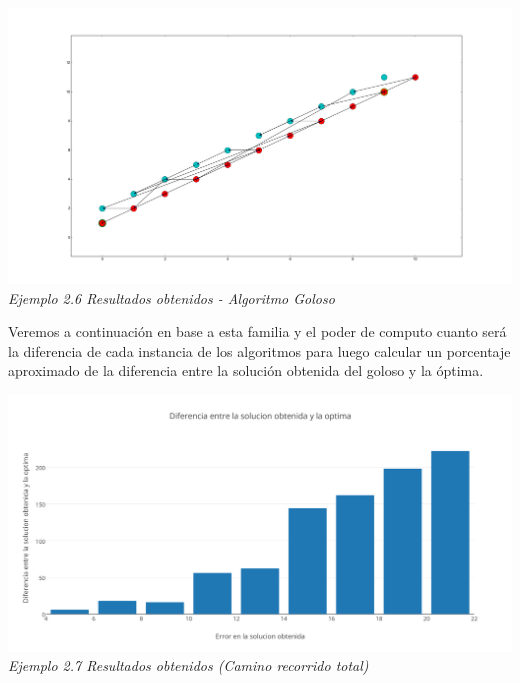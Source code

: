 \vspace*{0.3cm} \vspace*{0.3cm}
  \begin{center}
\includegraphics[scale=0.40]{./EJ2/algunGym0Goloso.png}
\\{\textit{Ejemplo 2.6 Resultados obtenidos - Algoritmo Goloso }}
  \end{center}
  \vspace*{0.3cm}

Veremos a continuaci\'on en base a esta familia y el poder de computo cuanto ser\'a la diferencia de cada instancia de los algoritmos para luego calcular un porcentaje aproximado de la diferencia entre la soluci\'on obtenida del goloso y la \'optima.

\vspace*{0.3cm} \vspace*{0.3cm}
  \begin{center}
\includegraphics[scale=0.5]{./EJ2/algungym0.png}
\\{\textit{Ejemplo 2.7 Resultados obtenidos (Camino recorrido total) }}
  \end{center}
  \vspace*{0.3cm}

